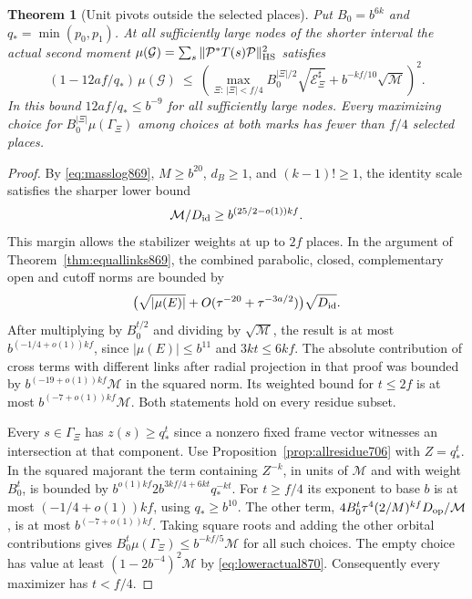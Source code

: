 \documentclass[a4paper,11pt]{article}
\newtheorem{theorem}[proposition]{Theorem}
\theoremstyle{definition}
\theoremstyle{remark}
\numberwithin{equation}{section}
\begin{document}
\begin{theorem}[Unit pivots outside the selected places]\leavevmode
\label{thm:bothmarks873}
Put \(B_0=b^{6k}\) and \(q_*=\min(p_0,p_1)\). At all sufficiently
large nodes of the shorter interval the actual second moment
\(\mu(\mathcal G)=\sum_s\|\mathcal P^*T(s)\mathcal P\|_{\rm HS}^2\)
satisfies
\[
 (1-12af/q_*)\,\mu(\mathcal G)
 \ \le\
 \left(\max_{\Xi:\,|\Xi|<f/4} B_0^{|\Xi|/2}
           \sqrt{\mathcal E_\Xi^\sharp}
       +b^{-kf/10}\sqrt{\mathcal M}\right)^2 .
\]
In this bound \(12af/q_*\le b^{-9}\) for all sufficiently
large nodes. Every maximizing choice for
\(B_0^{|\Xi|}\mu(\Gamma_\Xi)\) among choices at both marks has
fewer than \(f/4\) selected places.
\end{theorem}
\begin{proof}
By \eqref{eq:masslog869}, \(M\ge b^{20}\), \(d_B\ge1\),
and \((k-1)!\ge1\), the identity scale satisfies the sharper
lower bound
\[
     \mathcal M/D_{\rm id}\ge b^{(25/2-o(1))kf}.
\]
This margin allows the stabilizer weights at up to \(2f\)
places. In the argument of Theorem~\ref{thm:equallinks869}, the
combined parabolic, closed, complementary open and cutoff norms
are bounded by
\[
  \big(\sqrt{|\mu(E)|}+O(\tau^{-20}+\tau^{-3a/2})\big)
                         \sqrt{D_{\rm id}} .
\]
After multiplying by \(B_0^{t/2}\) and dividing by
\(\sqrt{\mathcal M}\), the result is at most
\(b^{(-1/4+o(1))kf}\), since \(|\mu(E)|\le b^{11}\) and
\(3kt\le6kf\). The absolute contribution of cross terms
with different links after radial projection in that proof
was bounded by \(b^{(-19+o(1))kf}\mathcal M\) in the squared
norm. Its weighted bound for \(t\le2f\) is at most
\(b^{(-7+o(1))kf}\mathcal M\). Both statements hold on every
residue subset.

Every \(s\in\Gamma_\Xi\) has \(z(s)\ge q_*^t\) since a nonzero
fixed frame vector witnesses an intersection at that component.
Use Proposition~\ref{prop:allresidue706} with \(Z=q_*^t\).
In the squared majorant the term containing \(Z^{-k}\), in
units of \(\mathcal M\) and with weight \(B_0^t\), is bounded by
\(b^{o(1)kf}2b^{3kf/4+6kt}q_*^{-kt}\).
For \(t\ge f/4\) its exponent to base \(b\) is at most
\((-1/4+o(1))kf\), using \(q_*\ge b^{10}\).
The other term, \(4B_0^t\tau^4(2/M)^{kf}D_{\rm op}/\mathcal M\),
is at most \(b^{(-7+o(1))kf}\).
Taking square roots and adding the other orbital contributions
gives \(B_0^t\mu(\Gamma_\Xi)\le b^{-kf/5}\mathcal M\) for all
such choices. The empty choice has value at least
\((1-2b^{-4})^2\mathcal M\) by \eqref{eq:loweractual870}.
Consequently every maximizer has \(t<f/4\).


\end{proof}
\end{document}
